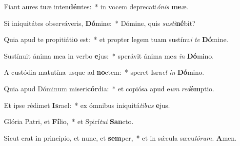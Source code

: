 \item Fiant aures tuæ inten\textbf{dén}tes:~* in vocem deprecati\hspace*{0.01em}\textit{ónis} \textbf{me}æ.
\item Si iniquitátes observáveris, \textbf{Dó}mine:~* Dómine, quis \textit{susti}\hspace{-0.01em}\textbf{né}bit?
\item Quia apud te propitiáti\textbf{o} est:~* et pro\-pter legem tuam sustínu\tinyhspace\textit{i} \textit{te} \textbf{Dó}mine.
\item Sustínuit ánima mea in verbo \textbf{e}jus:~* sperávit ánima me\tinyhspace\textit{a} \textit{in} \textbf{Dó}mino.
\item A custódia matutína usque ad \textbf{no}ctem:~* speret Isra\tinyhspace\textit{el} \textit{in} \textbf{Dó}mino.
\item Quia apud Dóminum miseri\textbf{cór}dia:~* et copiósa apud e\tinyhspace\textit{um} \textit{red}\textbf{ém}ptio.
\item Et ipse rédimet \textbf{Is}rael:~* ex ómnibus iniquitá\tinyhspace\textit{tibus} \textbf{e}jus.
\item Glória Patri, et \textbf{Fí}lio,~* et Spirí\tinyhspace\textit{tui} \textbf{San}cto.
\item Sicut erat in princípio, et nunc, et \textbf{sem}per,~* et in sǽcula sæcu\tinyhspace\textit{lórum.} \textbf{A}men.
